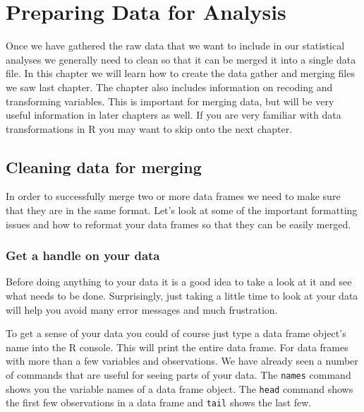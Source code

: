 



\chapter{Preparing Data for Analysis}\label{DataClean}

Once we have gathered the raw data that we want to include in our statistical analyses we generally need to clean so that it can be merged it into a single data file. In this chapter we will learn how to create the data gather and merging files we saw last chapter. The chapter also includes information on recoding and transforming variables. This is important for merging data, but will be very useful information in later chapters as well. If you are very familiar with data transformations in R you may want to skip onto the next chapter. 

\section{Cleaning data for merging}

In order to successfully merge two or more data frames we need to make sure that they are in the same format. Let's look at some of the important formatting issues and how to reformat your data frames so that they can be easily merged.

\subsection{Get a handle on your data}

Before doing anything to your data it is a good idea to take a look at it and see what needs to be done. Surprisingly, just taking a little time to look at your data will help you avoid many error messages and much frustration. 

To get a sense of your data you could of course just type a data frame object's name into the R console. This will print the entire data frame. For data frames with more than a few variables and observations. We have already seen a number of commands that are useful for seeing parts of your data. The \texttt{names} command shows you the variable names of a data frame object. The \texttt{head} command shows the first few observations in a data frame and \texttt{tail} shows the last few.

